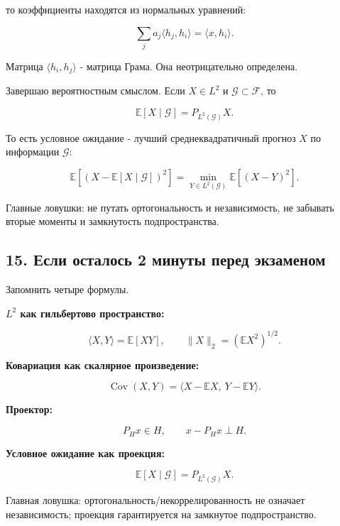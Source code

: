 \documentclass[
  11pt,
  a4paper,
]{article}
\begin{document}
то коэффициенты находятся из нормальных уравнений:

\[
\sum_j a_j\langle h_j,h_i\rangle=\langle x,h_i\rangle.
\]

Матрица \(\langle h_i,h_j\rangle\) - матрица Грама. Она неотрицательно
определена.

Завершаю вероятностным смыслом. Если \(X\in L^2\) и
\(\mathcal G\subset\mathcal F\), то

\[
\mathbb E[X\mid\mathcal G]
=
P_{L^2(\mathcal G)}X.
\]

То есть условное ожидание - лучший среднеквадратичный прогноз \(X\) по
информации \(\mathcal G\):

\[
\mathbb E[(X-\mathbb E[X\mid\mathcal G])^2]
=
\min_{Y\in L^2(\mathcal G)}\mathbb E[(X-Y)^2].
\]

Главные ловушки: не путать ортогональность и независимость, не забывать
вторые моменты и замкнутость подпространства.

\subsection{15. Если осталось 2 минуты перед
экзаменом}\label{ux435ux441ux43bux438-ux43eux441ux442ux430ux43bux43eux441ux44c-2-ux43cux438ux43dux443ux442ux44b-ux43fux435ux440ux435ux434-ux44dux43aux437ux430ux43cux435ux43dux43eux43c}

Запомнить четыре формулы.

\textbf{\(L^2\) как гильбертово пространство:}

\[
\langle X,Y\rangle=\mathbb E[XY],
\qquad
\|X\|_2=(\mathbb EX^2)^{1/2}.
\]

\textbf{Ковариация как скалярное произведение:}

\[
\operatorname{Cov}(X,Y)
=
\langle X-\mathbb EX,\ Y-\mathbb EY\rangle.
\]

\textbf{Проектор:}

\[
P_Hx\in H,
\qquad
x-P_Hx\perp H.
\]

\textbf{Условное ожидание как проекция:}

\[
\mathbb E[X\mid\mathcal G]
=
P_{L^2(\mathcal G)}X.
\]

Главная ловушка: ортогональность/некоррелированность не означает
независимость; проекция гарантируется на замкнутое подпространство.

\newpage
\end{document}
